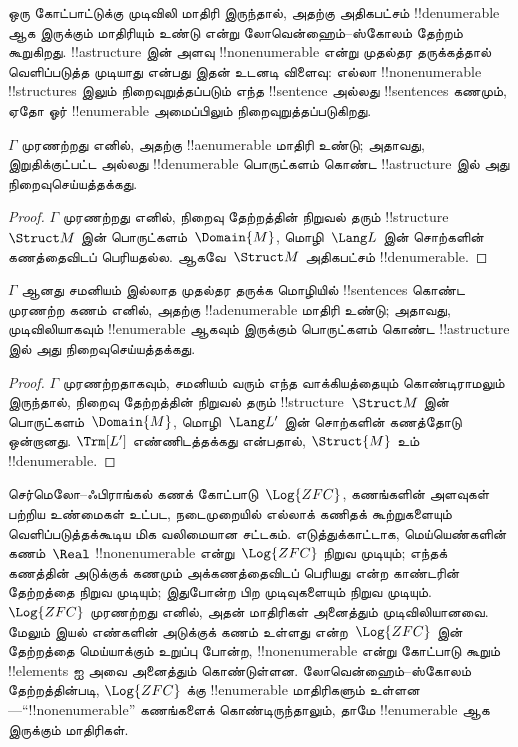 \documentclass[../../../include/open-logic-section]{subfiles}
\begin{document}


ஒரு கோட்பாட்டுக்கு முடிவிலி மாதிரி இருந்தால், அதற்கு அதிகபட்சம்
!!{denumerable} ஆக இருக்கும் மாதிரியும் உண்டு என்று லோவென்ஹைம்--ஸ்கோலம்
தேற்றம் கூறுகிறது. !!a{structure} இன் அளவு !!{nonenumerable} என்று முதல்தர
தருக்கத்தால் வெளிப்படுத்த முடியாது என்பது இதன் உடனடி விளைவு: எல்லா
!!{nonenumerable} !!{structure}s இலும் நிறைவுறுத்தப்படும் எந்த !!{sentence}
அல்லது !!{sentence}s கணமும், ஏதோ ஓர் !!{enumerable} அமைப்பிலும்
நிறைவுறுத்தப்படுகிறது.

\begin{thm}
 $\Gamma$ முரணற்றது எனில், அதற்கு
!!a{enumerable} மாதிரி உண்டு; அதாவது, இறுதிக்குட்பட்ட அல்லது
!!{denumerable} பொருட்களம் கொண்ட !!a{structure} இல் அது
நிறைவுசெய்யத்தக்கது.
\end{thm}

\begin{proof}
$\Gamma$ முரணற்றது எனில், நிறைவு தேற்றத்தின் நிறுவல் தரும்
!!{structure}~$\Struct M$ இன் பொருட்களம்~$\Domain{M}$, மொழி~$\Lang L$ இன்
சொற்களின் கணத்தைவிடப் பெரியதல்ல. ஆகவே~$\Struct M$ அதிகபட்சம்
!!{denumerable}.
\end{proof}

\begin{thm}
 $\Gamma$ ஆனது சமனியம் இல்லாத முதல்தர தருக்க மொழியில்
!!{sentence}s கொண்ட முரணற்ற கணம் எனில், அதற்கு !!a{denumerable} மாதிரி
உண்டு; அதாவது, முடிவிலியாகவும் !!{enumerable} ஆகவும் இருக்கும் பொருட்களம்
கொண்ட !!a{structure} இல் அது நிறைவுசெய்யத்தக்கது.
\end{thm}

\begin{proof}
$\Gamma$ முரணற்றதாகவும், சமனியம் வரும் எந்த வாக்கியத்தையும் கொண்டிராமலும்
இருந்தால், நிறைவு தேற்றத்தின் நிறுவல் தரும் !!{structure}~$\Struct M$ இன்
பொருட்களம்~$\Domain{M}$, மொழி~$\Lang L'$ இன் சொற்களின் கணத்தோடு ஒன்றானது.
$\Trm[L']$ எண்ணிடத்தக்கது என்பதால், $\Struct{M}$ உம் !!{denumerable}.
\end{proof}

\begin{ex}[ஸ்கோலமின் முரண்புதிர்]
செர்மெலோ--ஃபிராங்கல் கணக் கோட்பாடு~$\Log{ZFC}$, கணங்களின் அளவுகள் பற்றிய
உண்மைகள் உட்பட, நடைமுறையில் எல்லாக் கணிதக் கூற்றுகளையும் வெளிப்படுத்தக்கூடிய
மிக வலிமையான சட்டகம். எடுத்துக்காட்டாக, மெய்யெண்களின் கணம்~$\Real$
!!{nonenumerable} என்று~$\Log{ZFC}$ நிறுவ முடியும்; எந்தக் கணத்தின் அடுக்குக்
கணமும் அக்கணத்தைவிடப் பெரியது என்ற காண்டரின் தேற்றத்தை நிறுவ முடியும்;
இதுபோன்ற பிற முடிவுகளையும் நிறுவ முடியும். $\Log{ZFC}$ முரணற்றது எனில்,
அதன் மாதிரிகள் அனைத்தும் முடிவிலியானவை. மேலும் இயல் எண்களின் அடுக்குக் கணம்
உள்ளது என்ற~$\Log{ZFC}$ இன் தேற்றத்தை மெய்யாக்கும் உறுப்பு போன்ற,
!!{nonenumerable} என்று கோட்பாடு கூறும் !!{element}s ஐ அவை அனைத்தும்
கொண்டுள்ளன. லோவென்ஹைம்--ஸ்கோலம் தேற்றத்தின்படி, $\Log{ZFC}$ க்கு
!!{enumerable} மாதிரிகளும் உள்ளன---``!!{nonenumerable}'' கணங்களைக்
கொண்டிருந்தாலும், தாமே !!{enumerable} ஆக இருக்கும் மாதிரிகள்.
\end{ex}
\end{document}
